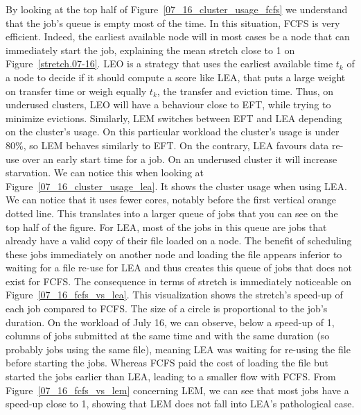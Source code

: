 \documentclass[conference,10pt]{IEEEtran}
\begin{document}
By looking at the top half of Figure~\ref{07_16_cluster_usage_fcfs}
we understand that the job's queue is empty most of the time.
In this situation, FCFS is very efficient. Indeed, the earliest available node will in
most cases be a node that can immediately start the job, explaining the mean stretch close to 1 on Figure~\ref{stretch.07-16}.
LEO is a strategy that uses the earliest available time $t_k$ of a node to decide if it should compute a score like LEA,
that puts a large weight on transfer time or weigh equally $t_k$, the transfer and eviction time. 
Thus, on underused clusters, LEO will have a behaviour close to EFT, while trying to minimize evictions.
Similarly, LEM switches between EFT and LEA depending on the cluster's usage.
On this particular workload the cluster's usage is under 80\%, so LEM behaves similarly to EFT.
On the contrary, LEA favours data re-use over an early start time for a job.
On an underused cluster it will increase starvation.
We can notice this when looking at
Figure~\ref{07_16_cluster_usage_lea}. It shows the cluster usage when using LEA.
We can notice that it uses fewer cores, notably before the first vertical orange dotted line. 
This translates into a larger queue of jobs that you can see on the top half of the figure.
For LEA, most of the jobs in this queue are jobs that already have a valid copy of their file loaded on a node. 
The benefit of scheduling these jobs immediately on another node and loading the file appears
inferior to waiting for a file re-use for LEA and thus creates this queue of jobs that does not exist for FCFS. 
The consequence in terms of stretch is immediately noticeable on Figure~\ref{07_16_fcfs_vs_lea}.
This visualization shows the stretch's speed-up of each job compared to FCFS.
The size of a circle is proportional to the job's duration.
On the workload of July 16, we can observe, below a speed-up of 1, columns of jobs submitted at the same time and
with the same duration (so probably jobs using the same file),
meaning LEA was waiting for re-using the file before starting the jobs.
Whereas FCFS paid the cost of loading the file but started the jobs
earlier than LEA, leading to a 
smaller flow with FCFS.
From Figure~\ref{07_16_fcfs_vs_lem} concerning LEM, we can see that most jobs have a speed-up close to 1, showing 
that LEM does not fall into LEA's pathological case.
\end{document}

